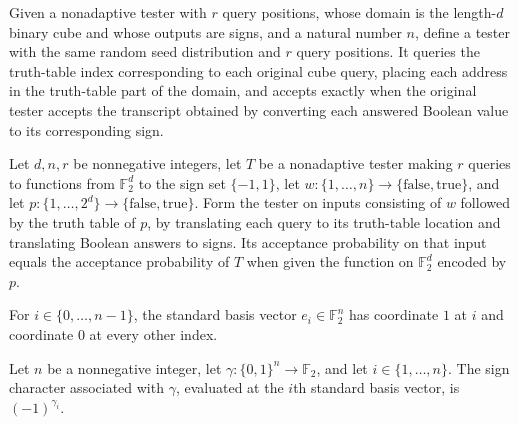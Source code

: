 \begin{definition}
\leanok
{}
Given a nonadaptive tester with $r$ query positions, whose domain is the length-$d$
binary cube and whose outputs are signs, and a natural number $n$, define a tester with
the same random seed distribution and $r$ query positions. It queries the truth-table
index corresponding to each original cube query, placing each address in the truth-table
part of the domain, and accepts exactly when the original tester accepts the transcript
obtained by converting each answered Boolean value to its corresponding sign.
\end{definition}

\begin{theorem}
\leanok
{}
Let $d,n,r$ be nonnegative integers, let $T$ be a nonadaptive tester making $r$ queries
to functions from $\mathbb F_2^d$ to the sign set $\{-1,1\}$, let
$w\colon\{1,\ldots,n\}\to\{\mathrm{false},\mathrm{true}\}$, and let
$p\colon\{1,\ldots,2^d\}\to\{\mathrm{false},\mathrm{true}\}$. Form the tester on inputs
consisting of $w$ followed by the truth table of $p$, by translating each query to its
truth-table location and translating Boolean answers to signs. Its acceptance
probability on that input equals the acceptance probability of $T$ when given the
function on $\mathbb F_2^d$ encoded by $p$.
\end{theorem}

\begin{definition}
\leanok
{}
For $i\in\{0,\ldots,n-1\}$, the standard basis vector $e_i\in\mathbb{F}_2^n$ has
coordinate $1$ at $i$ and coordinate $0$ at every other index.
\end{definition}

\begin{theorem}
\leanok
{}
Let $n$ be a nonnegative integer, let $\gamma\colon\{0,1\}^n\to\mathbb F_2$, and let
$i\in\{1,\ldots,n\}$. The sign character associated with $\gamma$, evaluated at the
$i$th standard basis vector, is $(-1)^{\gamma_i}$.
\end{theorem}

